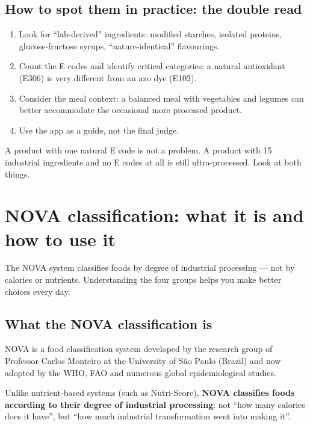 \documentclass[a5paper,12pt,oneside,openany]{book}
\newcommand{\boxinfo}[2]{%
  \begin{tcolorbox}[boxbase,
    colback=infoBlue!8!white, colframe=infoBlue, title={#1}]
  #2\end{tcolorbox}}
\begin{document}
\section{How to spot them in practice: the double read}

\begin{enumerate}
  \item Look for ``lab-derived'' ingredients: modified starches, isolated
    proteins, glucose-fructose syrups, ``nature-identical'' flavourings.
  \item Count the E codes and identify critical categories: a natural
    antioxidant (E306) is very different from an azo dye (E102).
  \item Consider the meal context: a balanced meal with vegetables and
    legumes can better accommodate the occasional more processed product.
  \item Use the app as a guide, not the final judge.
\end{enumerate}

\boxinfo{Summary in one sentence}{A product with one natural E code is
not a problem. A product with 15 industrial ingredients and no E codes
at all is still ultra-processed. Look at both things.}

\chapter{NOVA classification: what it is and how to use it}

The NOVA system classifies foods by degree of industrial processing ---
not by calories or nutrients. Understanding the four groups helps you
make better choices every day.

\section{What the NOVA classification is}

NOVA is a food classification system developed by the research group of
Professor Carlos Monteiro at the University of S\~{a}o Paulo (Brazil)
and now adopted by the WHO, FAO and numerous global epidemiological
studies.

Unlike nutrient-based systems (such as Nutri-Score), \textbf{NOVA
classifies foods according to their degree of industrial processing}:
not ``how many calories does it have'', but ``how much industrial
transformation went into making it''.
\end{document}
